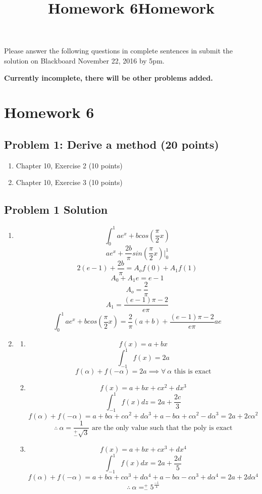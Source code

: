 \documentclass[]{article}
\title{Homework 6}
\title{Homework}
\providecommand{\tightlist}{%
  \setlength{\itemsep}{0pt}\setlength{\parskip}{0pt}}
\begin{document}
\maketitle

Please answer the following questions in complete sentences in submit
the solution on Blackboard November 22, 2016 by 5pm.

\textbf{Currently incomplete, there will be other problems added.}

\section{Homework 6}\label{homework-6}

\subsection{Problem 1: Derive a method (20
points)}\label{problem-1-derive-a-method-20-points}

\begin{enumerate}
\def\labelenumi{\arabic{enumi}.}
\tightlist
\item
  Chapter 10, Exercise 2 (10 points)
\item
  Chapter 10, Exercise 3 (10 points)
\end{enumerate}

\subsection{Problem 1 Solution}
\begin{enumerate}
\item
\[ \int_0^1 ae^x +b cos(\frac{\pi}{2} x) \]
\[ ae^x + \frac{2b}{\pi}sin(\frac{\pi}{2}x) \bigg|_0^1 \]
\[2(e-1)+\frac{2b}{\pi} = A_o f(0) + A_1 f(1) \]
\[ A_0 + A_1 e = e-1 \]
\[A_o = \frac{2}{\pi} \]
\[A_1 = \frac{(e-1)\pi -2}{e\pi} \]
\[\int_0^1 ae^x +b cos(\frac{\pi}{2} x) = \frac{2}{\pi}(a+b) + \frac{(e-1)\pi -2}{e\pi} ae \]
\item
\begin{enumerate}
\item 
\[f(x) = a+bx \]
\[\int_{-1}^1 f(x) = 2a \]
\[f(\alpha)+f(-\alpha)=2a \implies \forall \ \alpha \text{ this is exact} \]
\item
\[f(x) = a+bx+cx^2 + dx^3 \]
\[\int_{-1}^1 f(x)dz = 2a+\frac{2c}{3} \]
\[ f(\alpha) + f(-\alpha)=a+b\alpha+c\alpha ^2 + d\alpha ^3 + a -b\alpha+c \alpha ^2 -d\alpha ^3 = 2a+2c\alpha ^2 \]
\[\therefore \ \alpha = \frac{1}{_{-}^{+} \sqrt{3}} \text{ are the only value such that the poly is exact} \]
\item
\[ f(x) = a + bx + cx^3 + dx^4 \]
\[ \int_{-1}^1 f(x)dx = 2a + \frac{2d}{5} \]
\[f(\alpha)+f(-\alpha)=a+b\alpha+c\alpha^3+d\alpha^4+a-b\alpha-c\alpha^3+d\alpha^4=2a+2d\alpha^4\]
\[\therefore \ \alpha = _{-}^{+}5^{\frac{-1}{4}} \]
\end{enumerate}
\end{enumerate}
\end{document}
